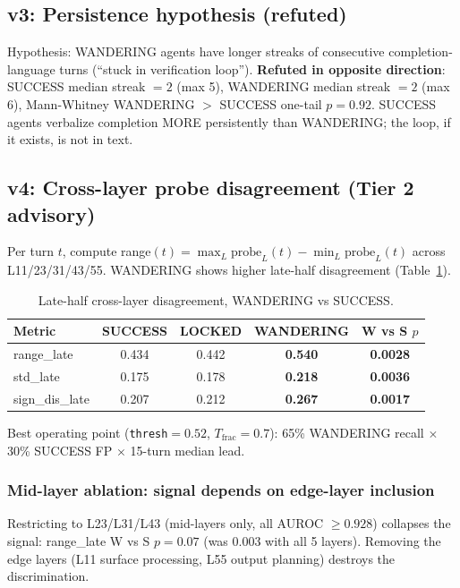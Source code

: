 \documentclass[11pt]{article}
\begin{document}
\subsection{v3: Persistence hypothesis (refuted)}
Hypothesis: WANDERING agents have longer streaks of consecutive completion-language turns (``stuck in verification loop''). \textbf{Refuted in opposite direction}: SUCCESS median streak $= 2$ (max 5), WANDERING median streak $= 2$ (max 6), Mann-Whitney WANDERING $>$ SUCCESS one-tail $p = 0.92$. SUCCESS agents verbalize completion MORE persistently than WANDERING; the loop, if it exists, is not in text.

\subsection{v4: Cross-layer probe disagreement (Tier 2 advisory)}\label{sec:v4}
Per turn $t$, compute range$(t) = \max_L \text{probe}_L(t) - \min_L \text{probe}_L(t)$ across L11/23/31/43/55. WANDERING shows higher late-half disagreement (Table~\ref{tab:v4}).

\begin{table}[h]
\centering
\caption{Late-half cross-layer disagreement, WANDERING vs SUCCESS.}\label{tab:v4}
\begin{tabular}{lcccc}
\toprule
Metric & SUCCESS & LOCKED & WANDERING & W vs S $p$ \\
\midrule
range\_late & 0.434 & 0.442 & \textbf{0.540} & \textbf{0.0028} \\
std\_late & 0.175 & 0.178 & \textbf{0.218} & \textbf{0.0036} \\
sign\_dis\_late & 0.207 & 0.212 & \textbf{0.267} & \textbf{0.0017} \\
\bottomrule
\end{tabular}
\end{table}

Best operating point (\texttt{thresh}$=0.52$, $T_{\text{frac}}=0.7$): 65\% WANDERING recall $\times$ 30\% SUCCESS FP $\times$ 15-turn median lead.

\subsubsection{Mid-layer ablation: signal depends on edge-layer inclusion}\label{sec:v4-midlayer}
Restricting to L23/L31/L43 (mid-layers only, all AUROC $\geq 0.928$) collapses the signal: range\_late W vs S $p = 0.07$ (was $0.003$ with all 5 layers). Removing the edge layers (L11 surface processing, L55 output planning) destroys the discrimination.
\end{document}
